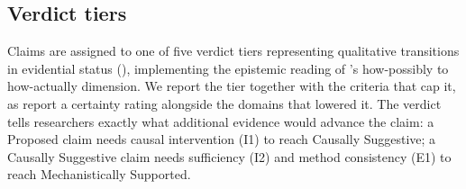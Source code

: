 \documentclass{article}
\begin{document}
\subsection{Verdict tiers}
\label{sec:verdict-tiers}

Claims are assigned to one of five verdict tiers representing qualitative transitions in evidential status (), implementing the epistemic reading of \citeauthor{craver2006when}'s how-possibly to how-actually dimension. We report the tier together with the criteria that cap it, as \citet{guyatt2008grade} report a certainty rating alongside the domains that lowered it. The verdict tells researchers exactly what additional evidence would advance the claim: a Proposed claim needs causal intervention (I1) to reach Causally Suggestive; a Causally Suggestive claim needs sufficiency (I2) and method consistency (E1) to reach Mechanistically Supported.
\end{document}
